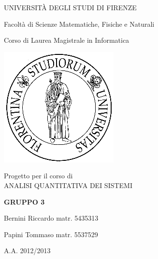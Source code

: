 \begin{titlepage}
\vspace{2cm}
	\begin{center}
		{\Large {UNIVERSIT\`{A} DEGLI STUDI DI FIRENZE}}
	\end{center}
	
	\begin{center}
		{\normalsize {Facoltà di Scienze Matematiche, Fisiche e Naturali}}
	\end{center}

	\begin{center}
		{\normalsize Corso di Laurea Magistrale in Informatica}
	\end{center}
\vspace{1cm}
	\begin{center}
		\includegraphics[scale=1]{unifi.jpg}
	\end{center}
\vspace{2cm}
	\begin{Huge}
		\begin{center}
			Progetto per il corso di\\ ANALISI QUANTITATIVA DEI SISTEMI
		\end{center}
	\end{Huge}
\vspace{1cm}
	\begin{center}
	\Large \textbf{GRUPPO 3}
	\end{center}
	\begin{center}
		{\large Bernini Riccardo matr. 5435313}
	\end{center}
    \begin{center}
		{\large Papini Tommaso matr. 5537529}
	\end{center}
\vspace{1.2cm}
	\begin{center}
		A.A. 2012/2013
	\end{center}
\end{titlepage}
